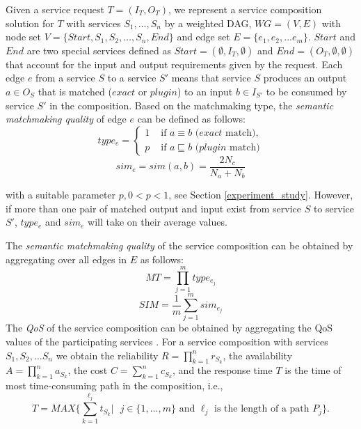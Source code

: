 \documentclass{llncs}
\begin{document}
Given a service request $T=(I_T,O_T)$, we represent a service composition solution for $T$ with services $S_1,\ldots,S_n$  by a weighted DAG, $WG=(V,E)$ with node set $V=\{Start, S_1, S_2, \ldots, S_n, End\}$ and edge set $E = \{e_{1}, e_{2},... e_{m} \}$. $Start$ and $End$ are two special services defined as $Start = (\emptyset, I_T, \emptyset )$ and $End  = (O_T, \emptyset, \emptyset)$ that account for the input and output requirements given by the request. Each edge $e$ from a service $S$ to a service $S'$ means that service $S$ produces an output $a\in O_S$ that is matched ($exact$ or $plugin$) to an input $b\in I_{S'}$ to be consumed by service $S'$ in the composition. Based on the matchmaking type, the \emph{semantic matchmaking quality} of edge $e$ can be defined as follows:
\vspace{-0.2cm}
\begin{equation}
\label{equation10}
type_e = 
\begin{cases}
	1 & \text{ if $a\equiv b$ ($exact$ match)},\\
	p & \text{ if $a \sqsubseteq b$ ($plugin$ match)}
\end{cases}
\end{equation}
\begin{equation}
\label{equation11}
sim_e = sim(a,b) = \frac{2N_c}{N_{a}+N_{b}}
\end{equation}

\noindent with a suitable parameter $p, 0<p< 1$, see Section \ref{experiment_study}. However, if more than one pair of matched output and input exist from service $S$ to service $S'$, $type_e$ and $sim_e$ will take on their average values.

The \emph{semantic matchmaking quality} of the service composition can be obtained by aggregating over all edges in $E$ as follows:
\vspace{-0.2cm}
\begin{equation}
\label{equation6}
MT {=} \prod_{j=1}^{m} type_ {e_{j}}
\end{equation}
\begin{equation}
\label{equation7}
SIM {=} \frac{1}{m}\sum_{j=1}^m sim_ {e_{j}}
\end{equation}
The \emph{QoS} of the service composition can be obtained by aggregating the QoS values of the participating services \cite{ma2015hybrid}. For a service composition with services $ S_1, S_2, ... S_n$ we obtain the reliability $R=\prod\limits^n_{k=1}r_{S_k}$, the availability $A=\prod\limits^n_{k=1}a_{S_k}$, the cost $C=\sum\limits^n_{k=1}c_{S_k}$, and the response time $T$ is the time of most time-consuming path in the composition, i.e., $$T = MAX \{\sum\limits^{\ell_j}_{k=1}t_{S_k} | \text{ $j\in\{1,\ldots,m\}$ and $\ell_j$ is the length of a path $P_j$}\}.$$
\end{document}
